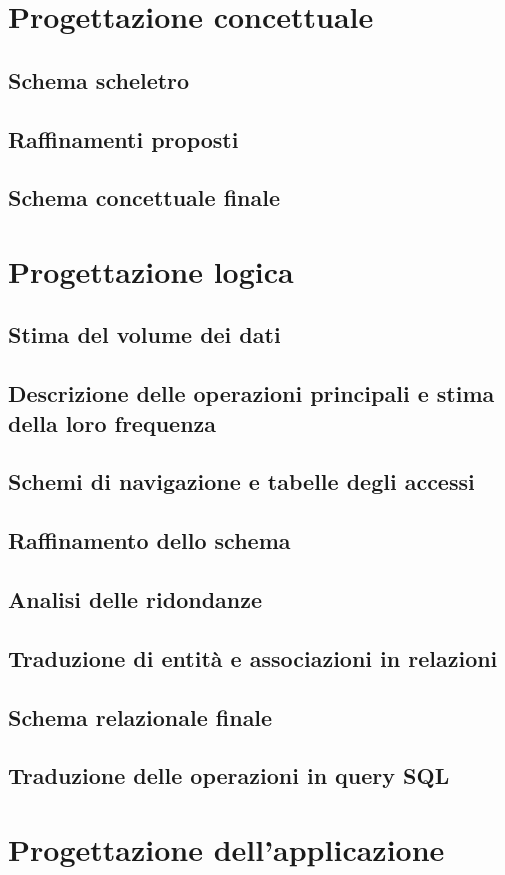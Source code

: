 \documentclass[a4paper,12pt]{report}
\begin{document}
\chapter{Progettazione concettuale}
\section{Schema scheletro}
\section{Raffinamenti proposti}
\section{Schema concettuale finale}
\newpage
\chapter{Progettazione logica}
\section{Stima del volume dei dati}
\section{Descrizione delle operazioni principali e stima della loro frequenza}
\section{Schemi di navigazione e tabelle degli accessi}
\section{Raffinamento dello schema}
\section{Analisi delle ridondanze}
\section{Traduzione di entità e associazioni in relazioni}
\section{Schema relazionale finale}
\section{Traduzione delle operazioni in query SQL}
\newpage
\chapter{Progettazione dell'applicazione}
\end{document}
